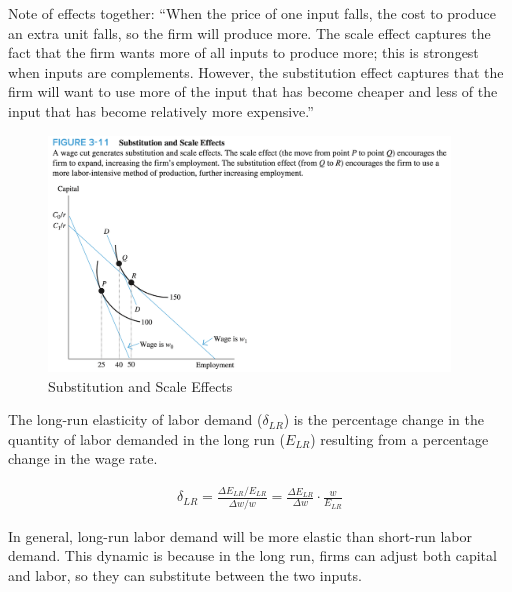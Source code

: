 Note of effects together: ``When the price of one 
input falls, the cost to produce an extra unit falls, so the firm 
will produce more. The scale effect captures the fact that
the firm wants more of all inputs to produce more; this is 
strongest when inputs are complements.
However, the substitution effect captures that the firm will
want to use more of the input that has become cheaper and less
of the input that has become relatively more expensive.''



\FloatBarrier

\begin{figure}[!htb]
    \centering
        \includegraphics[width=0.95\textwidth]{../input/ch_3p4_sub_scale_effects.png}
    \caption{Substitution and Scale Effects}
    \label{fig:ch_3p4_sub_scale_effects}
\end{figure}

\FloatBarrier


\begin{definition}

    The long-run elasticity of labor demand ($\delta_{LR}$)
    is the percentage change in the quantity of labor demanded in the
    long run ($E_{LR}$)
    resulting from a percentage change in the wage rate.
    
    \begin{align}
        \delta_{L R}=\frac{\Delta E_{L R} / E_{L R}}{\Delta w / w}=\frac{\Delta E_{L R}}{\Delta w} \cdot \frac{w}{E_{L R}}
    \end{align}
    
\end{definition}


In general, long-run labor demand will be more 
elastic than short-run labor demand. This dynamic is 
because in the long run, firms can adjust 
both capital and labor, so they can 
substitute between the two inputs.

